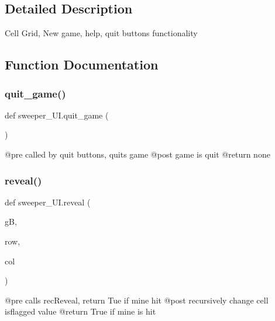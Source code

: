 \subsection{Detailed Description}
\begin{DoxyVerb}Cell Grid, New game, help, quit buttons functionality\end{DoxyVerb}
 

\subsection{Function Documentation}
\mbox{\label{namespacesweeper___u_i_a60d3b69c6e596a8cc72c88a3fd159926}} 
\subsubsection{\texorpdfstring{quit\+\_\+game()}{quit\_game()}}
{\footnotesize\ttfamily def sweeper\+\_\+\+U\+I.\+quit\+\_\+game (\begin{DoxyParamCaption}{ }\end{DoxyParamCaption})}

\begin{DoxyVerb}@pre called by quit buttons, quits game
@post game is quit
@return none
\end{DoxyVerb}
 \mbox{\label{namespacesweeper___u_i_a1d2372a72b38f4c14cfd981325b3ee83}} 
\subsubsection{\texorpdfstring{reveal()}{reveal()}}
{\footnotesize\ttfamily def sweeper\+\_\+\+U\+I.\+reveal (\begin{DoxyParamCaption}\item[{}]{gB,  }\item[{}]{row,  }\item[{}]{col }\end{DoxyParamCaption})}

\begin{DoxyVerb}@pre calls recReveal, return Tue if mine hit
@post recursively change cell isflagged value
@return True if mine is hit
\end{DoxyVerb}
 \mbox{\label{namespacesweeper___u_i_a6d328451ee39123c0cb2af67b6a79379}} 
